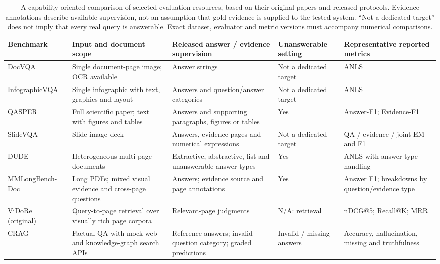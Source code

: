 \begin{table}[t]
\centering
\small
\renewcommand{\arraystretch}{1.16}
\begin{tabularx}{\textwidth}{@{}p{}p{}Xp{}p{}@{}}
\toprule
Benchmark & Input and document scope & Released answer / evidence supervision & Unanswerable setting & Representative reported metrics \\
\midrule
DocVQA~\cite{docvqa2020} & Single document-page image; OCR available & Answer strings & Not a dedicated target & ANLS \\
Infographic\allowbreak VQA~\cite{infographicvqa2021} & Single infographic with text, graphics and layout & Answers and question/answer categories & Not a dedicated target & ANLS \\
QASPER~\cite{infoseekqa2021} & Full scientific paper; text with figures and tables & Answers and supporting paragraphs, figures or tables & Yes & Answer-F1; Evidence-F1 \\
SlideVQA~\cite{slidevqa2023} & Slide-image deck & Answers, evidence pages and numerical expressions & Not a dedicated target & QA / evidence / joint EM and F1 \\
DUDE~\cite{dude2023} & Heterogeneous multi-page documents & Extractive, abstractive, list and unanswerable answer types & Yes & ANLS with answer-type handling \\
MMLongBench-Doc~\cite{mmlongbenchdoc2024} & Long PDFs; mixed visual evidence and cross-page questions & Answers; evidence source and page annotations & Yes & Answer F1; breakdowns by question/evidence type \\
ViDoRe (original)~\cite{faysse2024colpali} & Query-to-page retrieval over visually rich page corpora & Relevant-page judgments & N/A: retrieval & nDCG@5; Recall@K; MRR \\
CRAG~\cite{crag2024} & Factual QA with mock web and knowledge-graph search APIs & Reference answers; invalid-question category; graded predictions & Invalid / missing answers & Accuracy, hallucination, missing and truthfulness \\
\bottomrule
\end{tabularx}
\caption{A capability-oriented comparison of selected evaluation resources, based on their original papers and released protocols. Evidence annotations describe available supervision, not an assumption that gold evidence is supplied to the tested system. ``Not a dedicated target'' does not imply that every real query is answerable. Exact dataset, evaluator and metric versions must accompany numerical comparisons.}
\label{tab:benchmark_capabilities}
\end{table}

